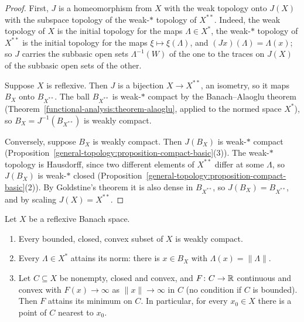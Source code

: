 \begin{proof}
First, $J$ is a homeomorphism from $X$ with the weak topology onto $J(X)$ with the subspace topology of the weak-$*$ topology of $X^{**}$. Indeed, the weak topology of $X$ is the initial topology for
the maps $\Lambda \in X^*$, the weak-$*$ topology of $X^{**}$ is the initial topology for the maps $\xi \mapsto \xi(\Lambda)$, and $(J x)(\Lambda) = \Lambda(x)$; so $J$ carries the subbasic open sets
$\Lambda^{-1}(W)$ of the one to the traces on $J(X)$ of the subbasic open sets of the other.

Suppose $X$ is reflexive. Then $J$ is a bijection $X \to X^{**}$, an isometry, so it maps $B_X$ onto $B_{X^{**}}$. The ball $B_{X^{**}}$ is weak-$*$ compact by the Banach--Alaoglu theorem
(Theorem~\ref{functional-analysis:theorem-alaoglu}, applied to the normed space $X^*$), so $B_X = J^{-1}(B_{X^{**}})$ is weakly compact.

Conversely, suppose $B_X$ is weakly compact. Then $J(B_X)$ is weak-$*$ compact (Proposition~\ref{general-topology:proposition-compact-basic}(3)). The weak-$*$ topology is Hausdorff, since two different
elements of $X^{**}$ differ at some $\Lambda$, so $J(B_X)$ is weak-$*$ closed (Proposition~\ref{general-topology:proposition-compact-basic}(2)). By Goldstine's theorem it is also dense in $B_{X^{**}}$, so
$J(B_X) = B_{X^{**}}$, and by scaling $J(X) = X^{**}$.
\end{proof}

\begin{corollary}\label{functional-analysis:corollary-reflexive-minimisation}
Let $X$ be a reflexive Banach space.
\begin{enumerate}
\item Every bounded, closed, convex subset of $X$ is weakly compact.
\item Every $\Lambda \in X^*$ attains its norm: there is $x \in B_X$ with $\Lambda(x) = \|\Lambda\|$.
\item Let $C \subseteq X$ be nonempty, closed and convex, and $F \colon C \to \mathbb{R}$ continuous and convex with $F(x) \to \infty$ as $\|x\| \to \infty$ in $C$ (no condition if $C$ is bounded). Then $F$ attains its
minimum on $C$. In particular, for every $x_0 \in X$ there is a point of $C$ nearest to $x_0$.
\end{enumerate}
\end{corollary}

